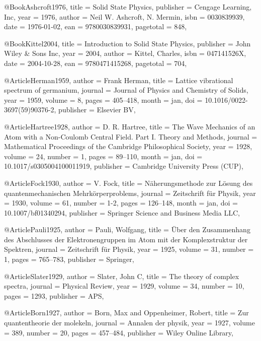 @Book{Ashcroft1976,
  title     = {Solid State Physics},
  publisher = {Cengage Learning, Inc},
  year      = {1976},
  author    = {Neil W. Ashcroft, N. Mermin},
  isbn      = {0030839939},
  date      = {1976-01-02},
  ean       = {9780030839931},
  pagetotal = {848},
}

@Book{Kittel2004,
  title     = {Introduction to Solid State Physics},
  publisher = {John Wiley \& Sons Inc},
  year      = {2004},
  author    = {Kittel, Charles},
  isbn      = {047141526X},
  date      = {2004-10-28},
  ean       = {9780471415268},
  pagetotal = {704},
}

@Article{Herman1959,
  author    = {Frank Herman},
  title     = {Lattice vibrational spectrum of germanium},
  journal   = {Journal of Physics and Chemistry of Solids},
  year      = {1959},
  volume    = {8},
  pages     = {405--418},
  month     = {jan},
  doi       = {10.1016/0022-3697(59)90376-2},
  publisher = {Elsevier {BV}},
}

@Article{Hartree1928,
  author    = {D. R. Hartree},
  title     = {The Wave Mechanics of an Atom with a Non-Coulomb Central Field. Part I. Theory and Methods},
  journal   = {Mathematical Proceedings of the Cambridge Philosophical Society},
  year      = {1928},
  volume    = {24},
  number    = {1},
  pages     = {89--110},
  month     = {jan},
  doi       = {10.1017/s0305004100011919},
  publisher = {Cambridge University Press ({CUP})},
}

@Article{Fock1930,
  author    = {V. Fock},
  title     = {N{\"a}herungsmethode zur L{\"o}sung des quantenmechanischen Mehrk{\"o}rperproblems},
  journal   = {Zeitschrift f{\"u}r Physik},
  year      = {1930},
  volume    = {61},
  number    = {1-2},
  pages     = {126--148},
  month     = {jan},
  doi       = {10.1007/bf01340294},
  publisher = {Springer Science and Business Media {LLC}},
}

@Article{Pauli1925,
  author    = {Pauli, Wolfgang},
  title     = {{\"U}ber den Zusammenhang des Abschlusses der Elektronengruppen im Atom mit der Komplexstruktur der Spektren},
  journal   = {Zeitschrift f{\"u}r Physik},
  year      = {1925},
  volume    = {31},
  number    = {1},
  pages     = {765--783},
  publisher = {Springer},
}

@Article{Slater1929,
  author    = {Slater, John C},
  title     = {The theory of complex spectra},
  journal   = {Physical Review},
  year      = {1929},
  volume    = {34},
  number    = {10},
  pages     = {1293},
  publisher = {APS},
}

@Article{Born1927,
  author    = {Born, Max and Oppenheimer, Robert},
  title     = {Zur quantentheorie der molekeln},
  journal   = {Annalen der physik},
  year      = {1927},
  volume    = {389},
  number    = {20},
  pages     = {457--484},
  publisher = {Wiley Online Library},
}

